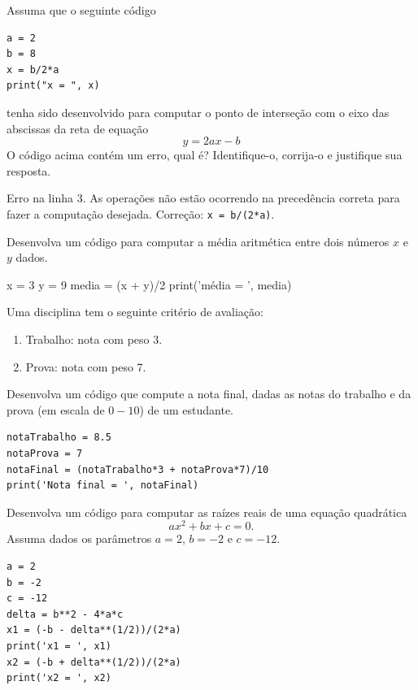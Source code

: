 \begin{exer}
  Assuma que o seguinte código {\python}
\begin{lstlisting}
a = 2
b = 8
x = b/2*a
print("x = ", x)
\end{lstlisting}
  tenha sido desenvolvido para computar o ponto de interseção com o eixo das abscissas da reta de equação
  \begin{equation}
    y = 2ax - b
  \end{equation}
  O código acima contém um erro, qual é? Identifique-o, corrija-o e justifique sua resposta.
\end{exer}
\begin{resp}
  Erro na linha 3. As operações não estão ocorrendo na precedência correta para fazer a computação desejada. Correção: \lstinline+x = b/(2*a)+.
\end{resp}

\begin{exer}
  Desenvolva um código {\python} para computar a média aritmética entre dois números $x$ e $y$ dados.
\end{exer}
\begin{resp}
  x = 3
  y = 9
  media = (x + y)/2
  print('média = ', media)
\end{resp}

\begin{exer}
  Uma disciplina tem o seguinte critério de avaliação:
  \begin{enumerate}
  \item Trabalho: nota com peso 3.
  \item Prova: nota com peso 7.
  \end{enumerate}
  Desenvolva um código {\python} que compute a nota final, dadas as notas do trabalho e da prova (em escala de $0 - 10$) de um estudante.
\end{exer}
\begin{resp}
\begin{lstlisting}
notaTrabalho = 8.5
notaProva = 7
notaFinal = (notaTrabalho*3 + notaProva*7)/10
print('Nota final = ', notaFinal)
\end{lstlisting}
\end{resp}

\begin{exer}
  Desenvolva um código {\python} para computar as raízes reais de uma equação quadrática
  \begin{equation}
    ax^2 + bx + c = 0.
  \end{equation}
  Assuma dados os parâmetros $a=2$, $b=-2$ e $c=-12$.
\end{exer}
\begin{resp}
\begin{lstlisting}
a = 2
b = -2
c = -12
delta = b**2 - 4*a*c
x1 = (-b - delta**(1/2))/(2*a)
print('x1 = ', x1)
x2 = (-b + delta**(1/2))/(2*a)
print('x2 = ', x2)
\end{lstlisting}
\end{resp}

